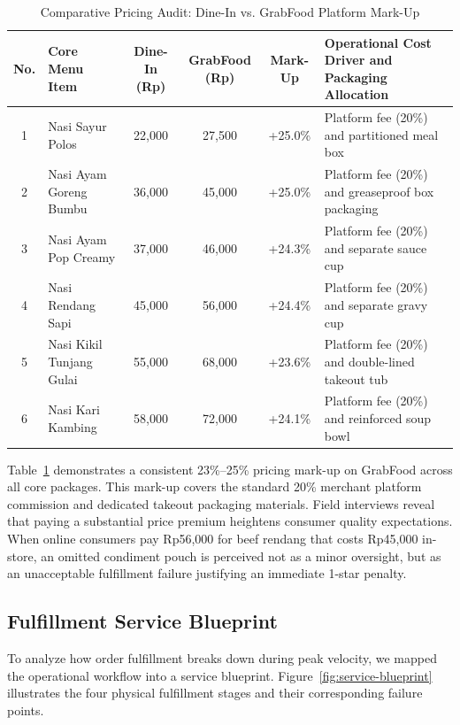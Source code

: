 \documentclass{jomas}
\begin{document}
\begin{table}[H]
\caption{Comparative Pricing Audit: Dine-In vs. GrabFood Platform Mark-Up}
\label{tab:price-markup}
\centering
\small
\setlength{\tabcolsep}{5pt}
\begin{tabularx}{\textwidth}{c l c c c X}
\toprule
\textbf{No.} & \textbf{Core Menu Item} & \textbf{Dine-In (Rp)} & \textbf{GrabFood (Rp)} & \textbf{Mark-Up} & \textbf{Operational Cost Driver and Packaging Allocation} \\
\midrule
1 & Nasi Sayur Polos & 22,000 & 27,500 & +25.0\% & Platform fee (20\%) and partitioned meal box \\
2 & Nasi Ayam Goreng Bumbu & 36,000 & 45,000 & +25.0\% & Platform fee (20\%) and greaseproof box packaging \\
3 & Nasi Ayam Pop Creamy & 37,000 & 46,000 & +24.3\% & Platform fee (20\%) and separate sauce cup \\
4 & Nasi Rendang Sapi & 45,000 & 56,000 & +24.4\% & Platform fee (20\%) and separate gravy cup \\
5 & Nasi Kikil Tunjang Gulai & 55,000 & 68,000 & +23.6\% & Platform fee (20\%) and double-lined takeout tub \\
6 & Nasi Kari Kambing & 58,000 & 72,000 & +24.1\% & Platform fee (20\%) and reinforced soup bowl \\
\bottomrule
\end{tabularx}
\end{table}

Table~\ref{tab:price-markup} demonstrates a consistent 23\%--25\% pricing mark-up on GrabFood across all core packages. This mark-up covers the standard 20\% merchant platform commission and dedicated takeout packaging materials. Field interviews reveal that paying a substantial price premium heightens consumer quality expectations. When online consumers pay Rp56,000 for beef rendang that costs Rp45,000 in-store, an omitted condiment pouch is perceived not as a minor oversight, but as an unacceptable fulfillment failure justifying an immediate 1-star penalty.

\subsection{Fulfillment Service Blueprint}
To analyze how order fulfillment breaks down during peak velocity, we mapped the operational workflow into a service blueprint. Figure~\ref{fig:service-blueprint} illustrates the four physical fulfillment stages and their corresponding failure points.
\end{document}
